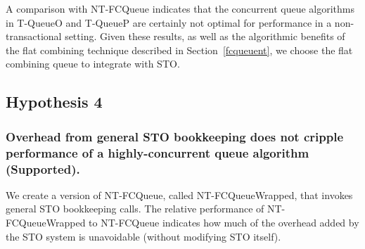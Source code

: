 A comparison with NT-FCQueue indicates that the concurrent queue algorithms in T-QueueO and T-QueueP are certainly not optimal for performance in a non-transactional setting.
Given these results, as well as the algorithmic benefits of the flat combining technique described in Section~\ref{fcqueuent}, we choose the flat combining queue to integrate with STO.

\vspace{12pt}
\noindent{}

\subsection{Hypothesis 4}
\subsubsection{Overhead from general STO bookkeeping does not cripple performance of a highly-concurrent queue algorithm (Supported).}

We create a version of NT-FCQueue, called NT-FCQueueWrapped, that invokes general STO bookkeeping calls. The relative performance of NT-FCQueueWrapped to NT-FCQueue indicates how much of the overhead added by the STO system is unavoidable (without modifying STO itself). 

